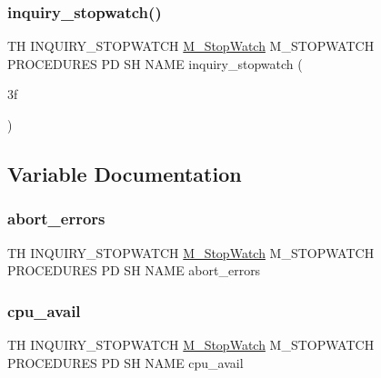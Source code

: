 \subsubsection{\texorpdfstring{inquiry\+\_\+stopwatch()}{inquiry\_stopwatch()}}
{\footnotesize\ttfamily TH I\+N\+Q\+U\+I\+R\+Y\+\_\+\+S\+T\+O\+P\+W\+A\+T\+CH \hyperlink{option__stopwatch_83_8txt_aa2011fc45a5e502e87ee50996a8a9305}{M\+\_\+\+Stop\+Watch} M\+\_\+\+S\+T\+O\+P\+W\+A\+T\+CH P\+R\+O\+C\+E\+D\+U\+R\+ES PD SH N\+A\+ME inquiry\+\_\+stopwatch (\begin{DoxyParamCaption}\item[{3f}]{ }\end{DoxyParamCaption})}



\subsection{Variable Documentation}
\mbox{\label{inquiry__stopwatch_83_8txt_a3a9b41223396c066db320e657bd8cba4}} 
\subsubsection{\texorpdfstring{abort\+\_\+errors}{abort\_errors}}
{\footnotesize\ttfamily TH I\+N\+Q\+U\+I\+R\+Y\+\_\+\+S\+T\+O\+P\+W\+A\+T\+CH \hyperlink{option__stopwatch_83_8txt_aa2011fc45a5e502e87ee50996a8a9305}{M\+\_\+\+Stop\+Watch} M\+\_\+\+S\+T\+O\+P\+W\+A\+T\+CH P\+R\+O\+C\+E\+D\+U\+R\+ES PD SH N\+A\+ME abort\+\_\+errors}

\mbox{\label{inquiry__stopwatch_83_8txt_a7abc42d907bf857b7ccd85e08a2698bf}} 
\subsubsection{\texorpdfstring{cpu\+\_\+avail}{cpu\_avail}}
{\footnotesize\ttfamily TH I\+N\+Q\+U\+I\+R\+Y\+\_\+\+S\+T\+O\+P\+W\+A\+T\+CH \hyperlink{option__stopwatch_83_8txt_aa2011fc45a5e502e87ee50996a8a9305}{M\+\_\+\+Stop\+Watch} M\+\_\+\+S\+T\+O\+P\+W\+A\+T\+CH P\+R\+O\+C\+E\+D\+U\+R\+ES PD SH N\+A\+ME cpu\+\_\+avail}

